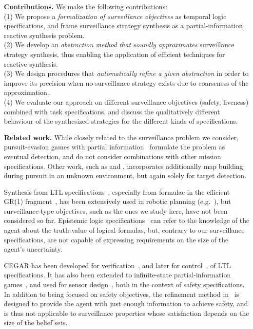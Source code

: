 {\bf Contributions.} We make the following contributions:\\
(1) We propose a \emph{formalization of surveillance objectives} as temporal logic specifications, and frame surveillance strategy synthesis  as a partial-information reactive synthesis problem.\\
(2) We develop an \emph{abstraction method that soundly approximates} surveillance strategy synthesis, thus enabling the application of efficient techniques for reactive synthesis.\\
(3) We design procedures that \emph{automatically refine a given abstraction} in order to improve its precision when no surveillance strategy exists due to coarseness of the approximation.\\
(4) We evaluate our approach on different surveillance objectives (safety, liveness) combined with task specifications, and discuss the qualitatively different behaviour of the synthesized strategies for the different kinds of specifications.

{\bf Related work.}
While closely related to the surveillance problem we consider, pursuit-evasion games with partial information~\cite{Chung2011, Chin2010, Antoniades2003} formulate the problem as eventual detection, and do not consider combinations with other mission specifications. Other work, such as \cite{Vidal2002} and \cite{Kim2001}, incorporates additionally map building during pursuit in an unknown environment, but again solely for target detection.

Synthesis from LTL specifications~\cite{Pnueli1989}, especially from formulae in the efficient GR(1) fragment~\cite{Piterman2006}, has been extensively used in robotic planning (e.g.~\cite{wong2012,Kress2007}), but surveillance-type objectives, such as the ones we study here, have not been considered so far. Epistemic logic specifications~\cite{MeydenV98} can refer to the knowledge of the agent about the truth-value of logical formulas, but, contrary to our surveillance specifications, are not capable of expressing requirements on the size of the agent's uncertainty.

CEGAR has been developed for verification~\cite{ClarkeGJLV00}, and later for control~\cite{HenzingerJM03}, of LTL specifications. 
It has also been extended to infinite-state partial-information games~\cite{DimitrovaF08}, and used for sensor design~\cite{FuDT14}, both in the context of safety specifications. In addition to being focused on safety objectives, the refinement method in~\cite{DimitrovaF08} is designed to provide the agent with just enough information to achieve safety, and is thus not applicable to surveillance properties whose satisfaction depends on the size of the belief sets.

